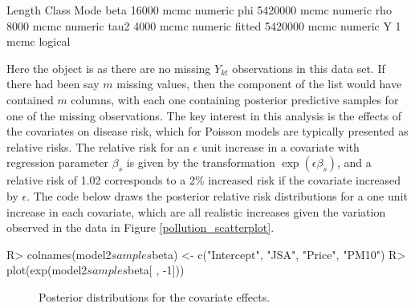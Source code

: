 \documentclass[article, nojss]{jss}
\begin{document}




\begin{CodeOutput}
       Length  Class Mode   
beta     16000 mcmc  numeric
phi    5420000 mcmc  numeric
rho       8000 mcmc  numeric
tau2      4000 mcmc  numeric
fitted 5420000 mcmc  numeric
Y            1 mcmc  logical
\end{CodeOutput}



Here the  object is  as there are no missing $Y_{kt}$ observations in this data set. If there had been say $m$ missing values, then the  component of the list would have contained $m$ columns, with each one containing posterior predictive samples for one of the missing observations. The key interest in this analysis is the effects of the covariates on disease risk, which for Poisson models are typically presented as relative risks. The relative risk for an $\epsilon$ unit increase in a covariate with regression parameter $\beta_s$ is given by the transformation $\exp(\epsilon\beta_s)$, and a relative risk of 1.02 corresponds to a 2\% increased risk if the covariate increased by $\epsilon$. The code below draws the posterior relative risk distributions for a one unit increase in each covariate, which are all realistic increases given the variation observed in the data in Figure \ref{pollution_scatterplot}.

\begin{CodeInput}
R> colnames(model2$samples$beta) <- c("Intercept", "JSA", "Price", "PM10")
R> plot(exp(model2$samples$beta[ , -1]))
\end{CodeInput}


\begin{figure}
\centering 
{}
\caption{Posterior distributions for the covariate effects.\label{pollution_mcmc}}
\end{figure} 
\end{document}
